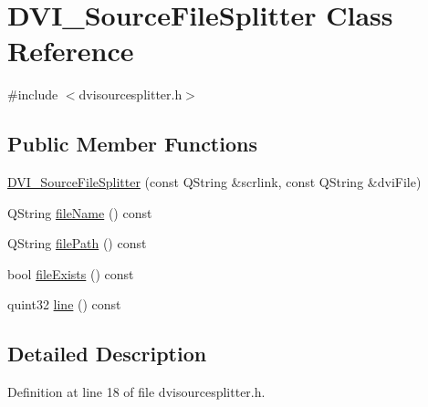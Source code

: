 \hypertarget{classDVI__SourceFileSplitter}{\section{D\+V\+I\+\_\+\+Source\+File\+Splitter Class Reference}
\label{classDVI__SourceFileSplitter}
}


{\ttfamily \#include $<$dvisourcesplitter.\+h$>$}

\subsection*{Public Member Functions}
\begin{DoxyCompactItemize}
\item 
\hyperlink{classDVI__SourceFileSplitter_aba678e0746b366b77494482c970d4316}{D\+V\+I\+\_\+\+Source\+File\+Splitter} (const Q\+String \&scrlink, const Q\+String \&dvi\+File)
\item 
Q\+String \hyperlink{classDVI__SourceFileSplitter_a17db00ec7e428e3ce86399db8773dd83}{file\+Name} () const 
\item 
Q\+String \hyperlink{classDVI__SourceFileSplitter_a4a38311dc73d70859eb139bb334b713e}{file\+Path} () const 
\item 
bool \hyperlink{classDVI__SourceFileSplitter_a943c4efab54e5ac54c294b252afff399}{file\+Exists} () const 
\item 
quint32 \hyperlink{classDVI__SourceFileSplitter_a2cc71ec5b2ea53196ce5879856803cda}{line} () const 
\end{DoxyCompactItemize}


\subsection{Detailed Description}


Definition at line 18 of file dvisourcesplitter.\+h.



